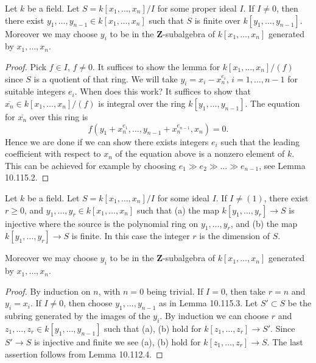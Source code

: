 \begin{lemma}[10.115.3, Tag 00OX]
Let $k$ be a field. Let $S=k[x_1,\ldots,x_n]/I$ for some proper ideal $I$. If $I\neq0$, then there exist $y_1,\ldots,y_{n-1}\in k[x_1,\ldots,x_n]$ such that $S$ is finite over $k[y_1,\ldots,y_{n-1}]$. Moreover we may choose $y_i$ to be in the $\mathbf Z$-subalgebra of $k[x_1,\ldots,x_n]$ generated by $x_1,\ldots,x_n$.
\end{lemma}
\begin{proof}
Pick $f\in I$, $f\neq0$. It suffices to show the lemma for $k[x_1,\ldots,x_n]/(f)$ since $S$ is a quotient of that ring. We will take $y_i=x_i-x_n^{e_i}$, $i=1,\ldots,n-1$ for suitable integers $e_i$. When does this work? It suffices to show that $\overline{x_n}\in k[x_1,\ldots,x_n]/(f)$ is integral over the ring $k[y_1,\ldots,y_{n-1}]$. The equation for $\overline{x_n}$ over this ring is
\[
f(y_1+x_n^{e_1},\ldots,y_{n-1}+x_n^{e_{n-1}},x_n)=0.
\]
Hence we are done if we can show there exists integers $e_i$ such that the leading coefficient with respect to $x_n$ of the equation above is a nonzero element of $k$. This can be achieved for example by choosing $e_1\gg e_2\gg\ldots\gg e_{n-1}$, see Lemma 10.115.2.
\end{proof}
\begin{lemma}
Let $k$ be a field. Let $S=k[x_1,\ldots,x_n]/I$ for some ideal $I$. If $I\neq(1)$, there exist $r\geq0$, and $y_1,\ldots,y_r\in k[x_1,\ldots,x_n]$ such that (a) the map $k[y_1,\ldots,y_r]\to S$ is injective where the source is the polynomial ring on $y_1,\ldots,y_r$, and (b) the map $k[y_1,\ldots,y_r]\to S$ is finite. In this case the integer $r$ is the dimension of $S$.

Moreover we may choose $y_i$ to be in the $\mathbf Z$-subalgebra of $k[x_1,\ldots,x_n]$ generated by $x_1,\ldots,x_n$.
\end{lemma}
\begin{proof}
By induction on $n$, with $n=0$ being trivial. If $I=0$, then take $r=n$ and $y_i=x_i$. If $I\neq0$, then choose $y_1,\ldots,y_{n-1}$ as in Lemma 10.115.3. Let $S'\subset S$ be the subring generated by the images of the $y_i$. By induction we can choose $r$ and $z_1,\ldots,z_r\in k[y_1,\ldots,y_{n-1}]$ such that (a), (b) hold for $k[z_1,\ldots,z_r]\to S'$. Since $S'\to S$ is injective and finite we see (a), (b) hold for $k[z_1,\ldots,z_r]\to S$. The last assertion follows from Lemma 10.112.4.
\end{proof}

